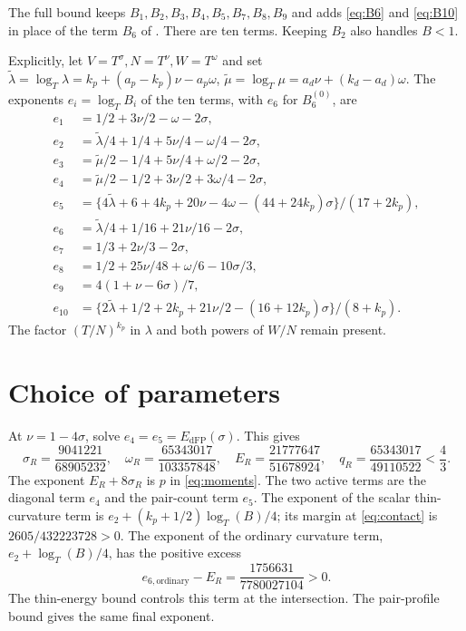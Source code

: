 \documentclass[11pt]{amsart}
\numberwithin{equation}{section}
\begin{document}
The full bound keeps \(B_1,B_2,B_3,B_4,B_5,B_7,B_8,B_9\) and adds
\eqref{eq:B6} and \eqref{eq:B10} in place of the term $B_6$ of
\cite[(\ref*{six-eq:nine})]{Weighted}. There are ten terms.
Keeping $B_2$ also handles $B<1$.

Explicitly, let \(V=T^\sigma,N=T^\nu,W=T^\omega\) and set
\(\tilde\lambda=\log_T\lambda=k_p+(a_p-k_p)\nu-a_p\omega\),
\(\tilde\mu=\log_T\mu=a_d\nu+(k_d-a_d)\omega\). The exponents
\(e_i=\log_TB_i\) of the ten terms, with \(e_6\) for \(B_6^{(0)}\), are
\begin{equation}\label{eq:costs}
\begin{aligned}
e_1&=1/2+3\nu/2-\omega-2\sigma,\\
e_2&=\tilde\lambda/4+1/4+5\nu/4-\omega/4-2\sigma,\\
e_3&=\tilde\mu/2-1/4+5\nu/4+\omega/2-2\sigma,\\
e_4&=\tilde\mu/2-1/2+3\nu/2+3\omega/4-2\sigma,\\
e_5&=\{4\tilde\lambda+6+4k_p+20\nu-4\omega-(44+24k_p)\sigma\}/(17+2k_p),\\
e_6&=\tilde\lambda/4+1/16+21\nu/16-2\sigma,\\
e_7&=1/3+2\nu/3-2\sigma,\\
e_8&=1/2+25\nu/48+\omega/6-10\sigma/3,\\
e_9&=4(1+\nu-6\sigma)/7,\\
e_{10}&=\{2\tilde\lambda+1/2+2k_p+21\nu/2-(16+12k_p)\sigma\}/(8+k_p).
\end{aligned}
\end{equation}
The factor \((T/N)^{k_p}\) in $\lambda$ and both powers of $W/N$
remain present.

\section{Choice of parameters}\label{sec:parameters}

At $\nu=1-4\sigma$, solve $e_4=e_5=E_{\mathrm{dFP}}(\sigma)$. This gives
\begin{equation}\label{eq:contact}
\sigma_R=\frac{9041221}{68905232},\quad
 \omega_R=\frac{65343017}{103357848},\quad
 E_R=\frac{21777647}{51678924},\quad
 q_R=\frac{65343017}{49110522}<\frac43.
\end{equation}
The exponent $E_R+8\sigma_R$ is $p$ in \eqref{eq:moments}. The two
active terms are the diagonal term $e_4$ and the pair-count term $e_5$.
The exponent of the scalar thin-curvature term is
$e_2+(k_p+1/2)\log_T(B)/4$; its margin at \eqref{eq:contact} is
$2605/432223728>0$. The exponent of the ordinary curvature term,
$e_2+\log_T(B)/4$, has the positive excess
\begin{equation}\label{eq:ordinaryexcess}
e_{6,\mathrm{ordinary}}-E_R
 =\frac{1756631}{7780027104}>0.
\end{equation}
The thin-energy bound controls this term at the intersection.
The pair-profile bound gives the same final exponent.
\end{document}
